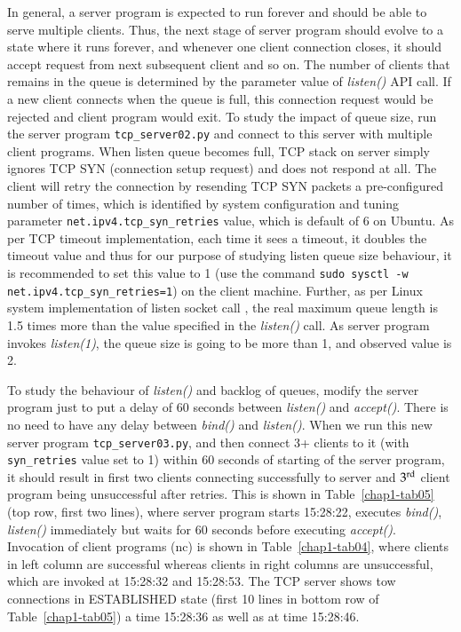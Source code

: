 \begin{multicols}{2}
In general, a server program is expected to run forever and should be able to serve multiple clients. Thus, the next stage of server program should evolve to a state where it runs forever, and whenever one client connection closes, it should accept request from next subsequent client and so on. The number of clients that remains in the queue is determined by the parameter value of \textit{listen()} API call. If a new client connects when the queue is full, this connection request would be rejected and client program would exit. To study the impact of queue size, run the server program \texttt{tcp\_server02.py}\cite{art1-key11} and connect to this server with multiple client programs. When listen queue becomes full, TCP stack on server simply ignores TCP SYN (connection setup request\cite{art1-key03}\cite{art1-key13}) and does not respond at all. The client will retry the connection by resending TCP SYN packets a pre-configured number of times, which is identified by system configuration and tuning parameter \texttt{net.ipv4.tcp\_syn\_retries} value, which is default of 6 on Ubuntu. As per TCP timeout implementation, each time it sees a timeout, it doubles the timeout value and thus for our purpose of studying listen queue size behaviour, it is recommended to set this value to 1 (use the command \texttt{sudo sysctl -w net.ipv4.tcp\_syn\_retries=1}) on the client machine. Further, as per Linux system implementation of listen socket call \cite{art1-key12}, the real maximum queue length is 1.5 times more than the value specified in the \textit{listen()} call. As server program invokes \textit{listen(1)}, the queue size is going to be more than 1, and observed value is 2.

To study the behaviour of \textit{listen()} and backlog of queues, modify the server program just to put a delay of 60 seconds between \textit{listen()} and \textit{accept()}. There is no need to have any delay between \textit{bind()} and \textit{listen()}. When we run this new server program \texttt{tcp\_server03.py}, and then connect 3+ clients to it (with \texttt{syn\_retries} value set to 1) within 60 seconds of starting of the server program, it should result in first two clients connecting successfully to server and $3^{\rm rd}$ client program being unsuccessful after retries. This is shown in Table~\ref{chap1-tab05} (top row, first two lines), where server program starts 15:28:22, executes \textit{bind()}, \textit{listen()} immediately but waits for 60 seconds before executing \textit{accept()}. Invocation of client programs (nc) is shown in Table~\ref{chap1-tab04}, where clients in left column are successful whereas clients in right columns are unsuccessful, which are invoked at 15:28:32 and 15:28:53. The TCP server shows tow connections in ESTABLISHED state (first 10 lines in bottom row of Table~\ref{chap1-tab05}) a time 15:28:36 as well as at time 15:28:46.


\end{multicols}
